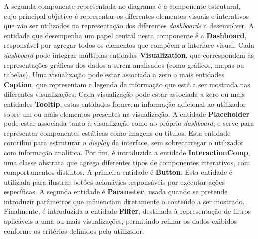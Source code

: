 A segunda componente representada no diagrama é a componente estrutural, cujo principal objetivo é representar os diferentes elementos visuais e interativos que vão ser utilizados na representação dos diferentes \textit{dashboards} a desenvolver. A entidade que desempenha um papel central nesta componente é a \textbf{Dashboard}, responsável por agregar todos os elementos que compôem a interface visual. Cada \textit{dashboard} pode integrar múltiplas entidades \textbf{Visualization}, que correspondem às representações gráficas dos dados a serem analisados (como gráficos, mapas ou tabelas). Uma visualização pode estar associada a zero o mais entidades \textbf{Caption}, que representam a legenda da informação que está a ser mostrada nas diferentes visualizações. Cada visualização pode estar associada a zero ou mais entidades \textbf{Tooltip}, estas entidades fornecem informação adicional ao utilizador sobre um ou mais elementos presentes na visualização. A entidade \textbf{Placeholder} pode estar associada tanto à visualização como ao próprio \textit{dashboard}, e serve para representar componentes estáticas como imagens ou títulos. Esta entidade contribui para estruturar o \textit{display} da interface, sem sobrecarregar o utilizador com informação analítica. Por fim, é introduzida a entidade \textbf{InteractionComp}, uma classe abstrata que agrega diferentes tipos de componentes interativos, com comportamentos distintos. A primeira entidade é \textbf{Button}. Esta entidade é utilizada para ilustrar botões acionávies responsáveis por executar ações específicas. A segunda entidade é \textbf{Parameter}, usada quando se pretende introduzir parâmetros que influenciam diretamente o conteúdo a ser mostrado. Finalmente, é introduzida a entidade \textbf{Filter}, destinada à representação de filtros aplicáveis a uma ou mais visualizações, permitindo refinar os dados exibidos conforme os critérios definidos pelo utilizador.

